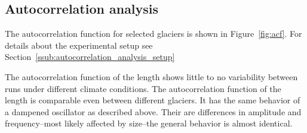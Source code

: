 
      


    \subsection{Autocorrelation analysis} %
    \label{sub:autocorrelation_analysis_results}

      The autocorrelation function for selected glaciers is shown in Figure~\ref{fig:acf}. For details about the experimental setup see Section~\ref{ssub:autocorrelation_analysis_setup}

      The autocorrelation function of the \vas{} length shows little to no variability between runs under different climate conditions. %
      The autocorrelation function of the \vas{} length is comparable even between different glaciers. It has the same behavior of a dampened oscillator as described above. Their are differences in amplitude and frequency--most likely affected by size--the general behavior is almost identical. 
      
